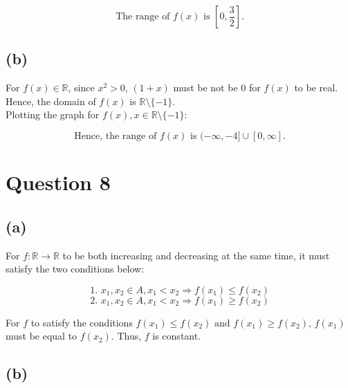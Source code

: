 \documentclass[11pt]{article}
\begin{document}
\[\text{The range of } f(x) \text{ is } \left[0, \frac{3}{2}\right].\]

\newpage

\subsection{(b)}
\label{sec:org537abeb}

For \(f(x) \in \mathbb{R}\), since \(x^2 > 0\), \((1 + x)\) must be not be 0 for \(f(x)\) to be real. Hence, the domain of \(f(x)\) is \(\mathbb{R} \setminus \{-1\}\).
\\[0pt]

Plotting the graph for \(f(x), x \in \mathbb{R} \setminus \{-1\}\):

\begin{center}
\end{center}

\[\text{Hence, the range of } f(x) \text{ is } (-\infty, -4] \cup [0, \infty].\]


\section{Question 8}
\label{sec:orgee72436}

\subsection{(a)}
\label{sec:org509353d}

For \(f : \mathbb{R} \rightarrow \mathbb{R}\) to be both increasing and decreasing at the same time, it must satisfy the two conditions below:

\[\text{1. } x_1, x_2 \in A, x_1 < x_2 \Rightarrow f(x_1) \le f(x_2)\]
\[\text{2. } x_1, x_2 \in A, x_1 < x_2 \Rightarrow f(x_1) \ge f(x_2)\]

For \(f\) to satisfy the conditions \(f(x_1) \le f(x_2) \text{ and } f(x_1) \ge f(x_2)\), \(f(x_1)\) must be equal to \(f(x_2)\). Thus, \(f\) is constant.

\newpage


\subsection{(b)}
\label{sec:org4c7788b}
\end{document}
